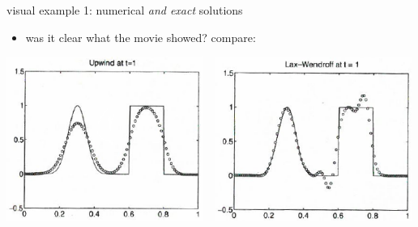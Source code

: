 \documentclass[10pt,hyperref]{beamer}
\begin{document}
\begin{frame}{visual example 1: numerical \emph{and exact} solutions}

\begin{itemize}
\item was it clear what the movie showed?  compare:
\end{itemize}

\bigskip
\hfill \mbox{\includegraphics[width=0.48\textwidth]{figs/leveque6p1upwind} \, \includegraphics[width=0.48\textwidth]{figs/leveque6p1lw}}
\end{frame}
\end{document}
